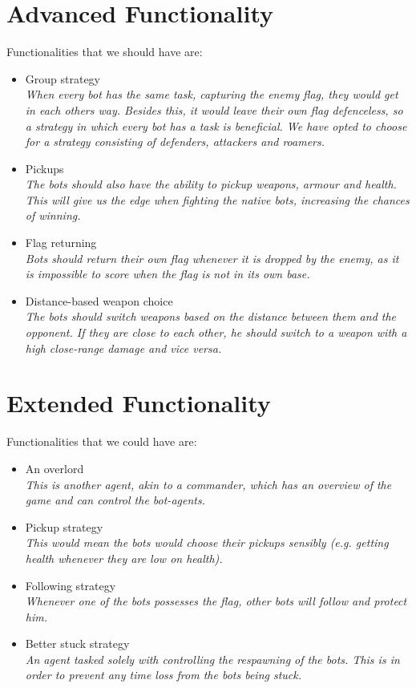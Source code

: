 \section{Advanced Functionality}
Functionalities that we should have are:
\begin{itemize}
	\item Group strategy \\
		\textit{When every bot has the same task, capturing the enemy flag, they would get in each others way. Besides this, it would leave their own flag defenceless, so a strategy in which every bot has a task is beneficial. We have opted to choose for a strategy consisting of defenders, attackers and roamers.}
	\item Pickups \\
		\textit{The bots should also have the ability to pickup weapons, armour and health. This will give us the edge when fighting the native bots, increasing the chances of winning.}
	\item Flag returning \\
		\textit{Bots should return their own flag whenever it is dropped by the enemy, as it is impossible to score when the flag is not in its own base.}
	\item Distance-based weapon choice \\
		\textit{The bots should switch weapons based on the distance between them and the opponent. If they are close to each other, he should switch to a weapon with a high close-range damage and vice versa.}
\end{itemize}

\section{Extended Functionality}
Functionalities that we could have are:
\begin{itemize}
	\item An overlord \\
		\textit{This is another agent, akin to a commander, which has an overview of the game and can control the bot-agents.}
	\item Pickup strategy \\
		\textit{This would mean the bots would choose their pickups sensibly (e.g. getting health whenever they are low on health).}
	\item Following strategy \\
		\textit{Whenever one of the bots possesses the flag, other bots will follow and protect him.}
	\item Better stuck strategy \\
		\textit{An agent tasked solely with controlling the respawning of the bots. This is in order to prevent any time loss from the bots being stuck.}
\end{itemize}

